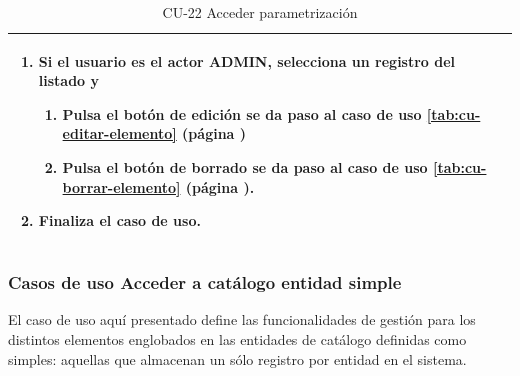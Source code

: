 \begin{table} [H]
{\begin{tabular}{| m{3cm} | m{11cm} |}
\begin{enumerate}
		\item Si el usuario es el actor ADMIN, selecciona un registro del listado y
		    \begin{enumerate}
		        \item Pulsa el botón de edición se da paso al caso de uso \ref{tab:cu-editar-elemento} (página \pageref{tab:cu-editar-elemento})
		        \item Pulsa el botón de borrado se da paso al caso de uso \ref{tab:cu-borrar-elemento} (página \pageref{tab:cu-borrar-elemento}).
		    \end{enumerate} 
		\item Finaliza el caso de uso.		
	  \end{enumerate} 	  	  
	  \\\hline
    \end{tabular}
    } %
    \caption{CU-22 Acceder parametrización}
    \label{tab:cu-listar-parametrización}
\end{table}



\subsubsection{Casos de uso Acceder a catálogo entidad simple} 
\label{sub:cu-catalogo-simple}

El caso de uso aquí presentado define las funcionalidades de gestión para los distintos elementos englobados en las entidades de catálogo definidas como simples: aquellas que almacenan un sólo registro por entidad en el sistema. 
 

